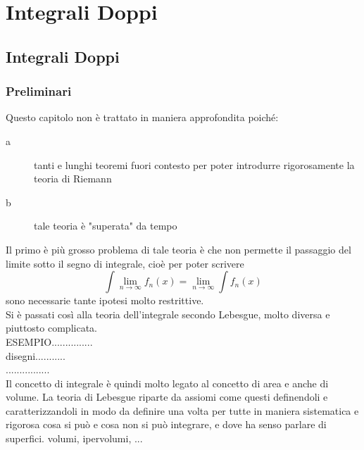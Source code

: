 \part{Integrali Doppi}
\chapter{Integrali Doppi}
\section{Preliminari}
Questo capitolo non è trattato in maniera approfondita poiché:
\begin{description}
	\item[a] tanti e lunghi teoremi fuori contesto per poter introdurre rigorosamente la teoria di Riemann
	\item[b] tale teoria è "superata" da tempo
\end{description}
Il primo è più grosso problema di tale teoria è che non permette il passaggio del limite sotto il segno di integrale, cioè per poter scrivere 
$$ \int\lim\limits_{n\to\infty}f_n(x) = \lim\limits_{n\to\infty}\int f_n(x)$$ sono necessarie tante ipotesi molto restrittive.\\
Si è passati così alla teoria dell'integrale secondo Lebesgue, molto diversa e piuttosto complicata.\\
ESEMPIO...............\\
disegni...........\\
................\\
Il concetto di integrale è quindi molto legato al concetto di area e anche di volume. La teoria di Lebesgue riparte da assiomi come questi definendoli e caratterizzandoli in modo da definire una volta per tutte in maniera sistematica e rigorosa cosa si può e cosa non si può integrare, e dove ha senso parlare di superfici. volumi, ipervolumi, ... 
